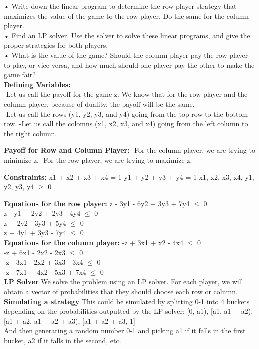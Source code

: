 \documentclass[11pt, solution, letterpaper]{format}
\begin{document}
 • Write down the linear program to determine the row player strategy that maximizes the value of the game
to the row player. Do the same for the column player.\\
• Find an LP solver. Use the solver to solve these linear programs, and give the proper strategies for both
players.\\
• What is the value of the game? Should the column player pay the row player to play, or vice versa, and
how much should one player pay the other to make the game fair?\\


\textbf{Defining Variables:}\\
-Let us call the payoff for the game z. We know that for the row player and the column player, because of duality, the payoff will be the same.\\
-Let us call the rows (y1, y2, y3, and y4) going from the top row to the bottom row. 
-Let us call the colomns (x1, x2, x3, and x4) going from the left column to the right column.

\textbf{Payoff for Row and Column Player:}
-For the column player, we are trying to minimize z. 
-For the row player, we are trying to maximize z. 

\textbf{Constraints:}
x1 + x2 + x3 + x4 = 1
y1 + y2 + y3 + y4 = 1
x1, x2, x3, x4, y1, y2, y3, y4 $\geq$ 0

\textbf{Equations for the row player:}
z - 3y1 - 6y2 + 3y3 + 7y4 $\leq$ 0 \\
z - y1 + 2y2 + 2y3 - 4y4 $\leq$ 0\\
z      + 2y2 - 3y3 + 5y4 $\leq$ 0\\
z + 4y1      + 3y3 - 7y4 $\leq$ 0\\

\textbf{Equations for the column player:}
-z + 3x1 + x2     - 4x4 $\leq$ 0\\
-z + 6x1 - 2x2 - 2x3     $\leq$ 0\\
-z - 3x1 - 2x2 + 3x3 - 3x4 $\leq$ 0\\
-z - 7x1 + 4x2 - 5x3 + 7x4 $\leq$ 0 \\

\textbf{LP Solver}
We solve the problem using an LP solver. For each player, we will obtain a vector of probabilities that they should choose each row or column. \\

\textbf{Simulating a strategy}
This could be simulated by splitting 0-1 into 4 buckets depending on the probabilities outputted by the LP solver: [0, a1), [a1, a1 + a2), [a1 + a2, a1 + a2 + a3), [a1 + a2 + a3, 1]\\
And then generating a random number 0-1 and picking a1 if it falls in the first bucket, a2 if it falls in the second, etc. \\
\end{document}
